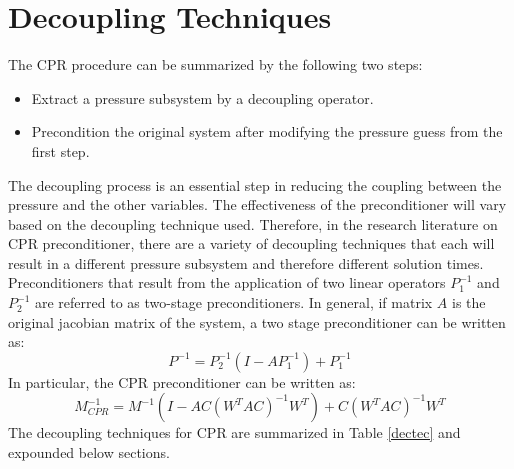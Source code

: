 \section{Decoupling Techniques}
The CPR procedure can be summarized by the following two steps:
\begin{itemize}
	\item Extract a pressure subsystem by a decoupling operator.
	\item Precondition the original system after modifying the pressure guess from the first step.
\end{itemize}
The decoupling process is an essential step in reducing the coupling between the pressure and the other variables.
The effectiveness of the preconditioner will vary based on the decoupling technique used. Therefore, in the research
literature on CPR preconditioner, there are a variety of decoupling techniques that each will result in a different pressure
subsystem and therefore different solution times. Preconditioners that result from the application of two linear operators
$P_{1}^{-1}$ and $P_{2}^{-1}$ are referred to as two-stage preconditioners. In general, if matrix $A$ is the original jacobian
matrix of the system, a two stage preconditioner can be written as:
\begin{equation}
	P^{-1} = P_{2}^{-1}(I-AP_{1}^{-1}) + P_{1}^{-1}
\end{equation}
In particular, the CPR preconditioner can be written as:
\begin{equation}
	M_{CPR}^{-1} = M^{-1}(I - AC(W^{T}AC)^{-1}W^{T}) + C(W^{T}AC)^{-1}W^{T}
\end{equation}
The decoupling techniques for CPR are summarized in Table \ref{dectec} and expounded below sections.


